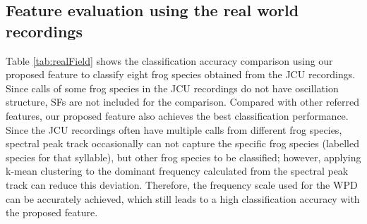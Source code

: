 \subsection{Feature evaluation using the real world recordings}
Table \ref{tab:realField} shows the classification accuracy comparison using our proposed feature to classify eight frog species obtained from the JCU recordings. Since calls of some frog species in the JCU recordings do not have oscillation structure, SFs are not included for the comparison. Compared with other referred features, our proposed feature also achieves the best classification performance.
Since the JCU recordings often have multiple calls from different frog species, spectral peak track occasionally can not capture the specific frog species (labelled species for that syllable), but other frog species to be classified; however, applying k-mean clustering to the dominant frequency calculated from the spectral peak track can reduce this deviation. Therefore, the frequency scale used for the WPD can be accurately achieved, which still leads to a high classification accuracy with the proposed feature.

\begin{table}[htb!]
\centering
\caption{Classification accuracy using the JCU recordings.}
\label{tab:realField}
\end{table}


